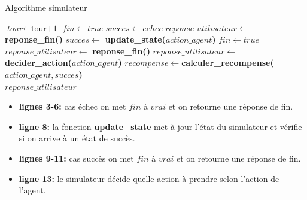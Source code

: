 \begin{algorithm}[H]
	\caption{Algorithme simulateur}\label{euclid}
	\begin{algorithmic}[1]
		\State $\textit{tour} \gets \text{tour+1}$
		\State $fin \gets true$
		\State $succes \gets echec$
		\State $reponse\_utilisateur \gets $ \textbf{reponse\_fin()}
		\Else
		\State $succes \gets$ \textbf{update\_state(}$action\_agent$\textbf{)}
		\State $fin \gets true$
		\State $reponse\_utilisateur \gets $ \textbf{reponse\_fin()}
		\Else 
		\State $reponse\_utilisateur \gets $ \textbf{decider\_action(}$action\_agent$\textbf{)}
		\EndIf
		\EndIf
		\State $recompense \gets $\textbf{calculer\_recompense(}$action\_agent, succes$\textbf{)}\\
		\Return $reponse\_utilisateur$
		\EndProcedure
		
	\end{algorithmic}
\end{algorithm}
\begin{itemize}
	\item \textbf{lignes 3-6:} cas échec on met $fin$ à $vrai$ et on retourne une réponse de fin.
	\item \textbf{ligne 8:} la fonction \textbf{update\_state} met à jour l'état du simulateur et vérifie si on arrive à un état de succès.
	\item \textbf{lignes 9-11:} cas succès on met $fin$ à $vrai$ et on retourne une réponse de fin.
	\item \textbf{ligne 13:} le simulateur décide quelle action à prendre selon l'action de l'agent.
\end{itemize}

